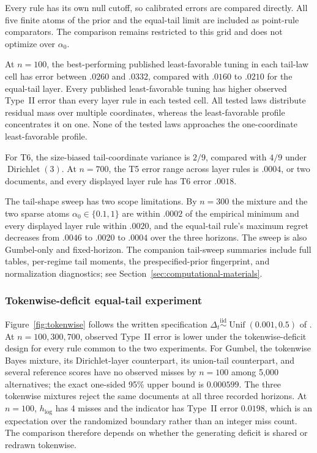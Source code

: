 \documentclass[11pt]{article}
\newcommand{\Unif}{\operatorname{Unif}}
\begin{document}
Every rule has its own null cutoff, so calibrated errors are compared directly.  All five finite atoms of the prior and the equal-tail limit are included as point-rule comparators.  The comparison remains restricted to this grid and does not optimize over $\alpha_0$.

At $n=100$, the best-performing published least-favorable tuning in each tail-law cell has error between $.0260$ and $.0332$, compared with $.0160$ to $.0210$ for the equal-tail layer.  Every published least-favorable tuning has higher observed Type~II error than every layer rule in each tested cell.  All tested laws distribute residual mass over multiple coordinates, whereas the least-favorable profile concentrates it on one.  None of the tested laws approaches the one-coordinate least-favorable profile.

For T6, the size-biased tail-coordinate variance is $2/9$, compared with $4/9$ under $\operatorname{Dirichlet}(3)$.  At $n=700$, the T5 error range across layer rules is $.0004$, or two documents, and every displayed layer rule has T6 error $.0018$.

The tail-shape sweep has two scope limitations.  By $n=300$ the mixture and the two sparse atoms $\alpha_0\in\{0.1,1\}$ are within $.0002$ of the empirical minimum and every displayed layer rule within $.0020$, and the equal-tail rule's maximum regret decreases from $.0046$ to $.0020$ to $.0004$ over the three horizons.  The sweep is also Gumbel-only and fixed-horizon.  The companion tail-sweep summaries include full tables, per-regime tail moments, the prespecified-prior fingerprint, and normalization diagnostics; see Section~\ref{sec:computational-materials}.

\FloatBarrier
\subsubsection{Tokenwise-deficit equal-tail experiment}
\label{sec:tokenwise-supplement}

Figure~\ref{fig:tokenwise} follows the written specification $\Delta_t\stackrel{\mathrm{iid}}{\sim}\Unif(0.001,0.5)$ of \citet{li2025framework}.  At $n=100,300,700$, observed Type~II error is lower under the tokenwise-deficit design for every rule common to the two experiments.  For Gumbel, the tokenwise Bayes mixture, its Dirichlet-layer counterpart, its union-tail counterpart, and several reference scores have no observed misses by $n=100$ among 5,000 alternatives; the exact one-sided 95\% upper bound is $0.000599$.  The three tokenwise mixtures reject the same documents at all three recorded horizons.  At $n=100$, $h_{\log}$ has 4 misses and the indicator has Type~II error $0.0198$, which is an expectation over the randomized boundary rather than an integer miss count.  The comparison therefore depends on whether the generating deficit is shared or redrawn tokenwise.
\end{document}
